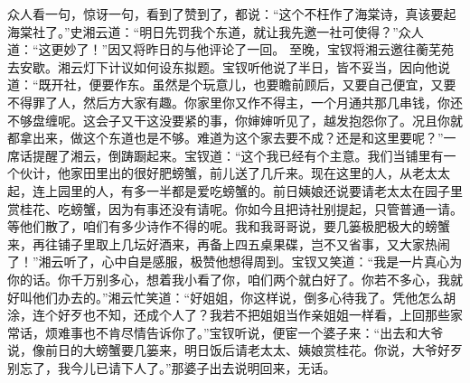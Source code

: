 \documentclass[12pt,oneside]{book}
\begin{document}
众人看一句，惊讶一句，看到了赞到了，都说：“这个不枉作了海棠诗，真该要起海棠社了。”史湘云道：“明日先罚我个东道，就让我先邀一社可使得？”众人道：“这更妙了！”因又将昨日的与他评论了一回。
至晚，宝钗将湘云邀往蘅芜苑去安歇。湘云灯下计议如何设东拟题。宝钗听他说了半日，皆不妥当，因向他说道：“既开社，便要作东。虽然是个玩意儿，也要瞻前顾后，又要自己便宜，又要不得罪了人，然后方大家有趣。你家里你又作不得主，一个月通共那几串钱，你还不够盘缠呢。这会子又干这没要紧的事，你婶婶听见了，越发抱怨你了。况且你就都拿出来，做这个东道也是不够。难道为这个家去要不成？还是和这里要呢？”一席话提醒了湘云，倒踌蹰起来。宝钗道：“这个我已经有个主意。我们当铺里有一个伙计，他家田里出的很好肥螃蟹，前儿送了几斤来。现在这里的人，从老太太起，连上园里的人，有多一半都是爱吃螃蟹的。前日姨娘还说要请老太太在园子里赏桂花、吃螃蟹，因为有事还没有请呢。你如今且把诗社别提起，只管普通一请。等他们散了，咱们有多少诗作不得的呢。我和我哥哥说，要几篓极肥极大的螃蟹来，再往铺子里取上几坛好酒来，再备上四五桌果碟，岂不又省事，又大家热闹了！”湘云听了，心中自是感服，极赞他想得周到。宝钗又笑道：“我是一片真心为你的话。你千万别多心，想着我小看了你，咱们两个就白好了。你若不多心，我就好叫他们办去的。”湘云忙笑道：“好姐姐，你这样说，倒多心待我了。凭他怎么胡涂，连个好歹也不知，还成个人了？我若不把姐姐当作亲姐姐一样看，上回那些家常话，烦难事也不肯尽情告诉你了。”宝钗听说，便宦一个婆子来：“出去和大爷说，像前日的大螃蟹要几篓来，明日饭后请老太太、姨娘赏桂花。你说，大爷好歹别忘了，我今儿已请下人了。”那婆子出去说明回来，无话。
\end{document}
